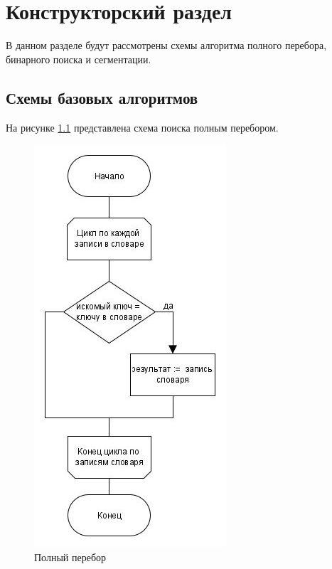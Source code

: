 \chapter{Конструкторский раздел}
\label{cha:design}
В данном разделе будут рассмотрены схемы алгоритма полного перебора, бинарного поиска и сегментации.

\section{Схемы базовых алгоритмов}
На рисунке \ref{fig:fullsearch} представлена схема поиска полным перебором.
\begin{figure}[H]
	\centering
	\includegraphics[width=0.5\linewidth]{src/fullsearch}
	\caption{Полный перебор}
	\label{fig:fullsearch}
\end{figure}

